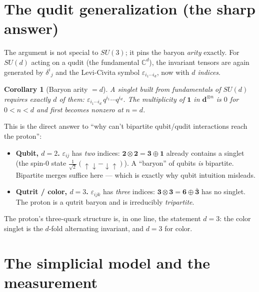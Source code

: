 \documentclass[11pt]{article}
\newtheorem{corollary}{Corollary}
\theoremstyle{definition}
\newcommand{\C}{\mathbb{C}}
\newcommand{\rep}[1]{\mathbf{#1}}      %
\newcommand{\triv}{\mathbf{1}}         %
\begin{document}
\section{The qudit generalization (the sharp answer)}

The argument is not special to $SU(3)$; it pins the baryon \emph{arity} exactly.
For $SU(d)$ acting on a qudit (the fundamental $\C^d$), the invariant tensors are
again generated by $\delta^{i}{}_{j}$ and the Levi-Civita symbol
$\varepsilon_{i_1\cdots i_d}$, now with \emph{$d$ indices}.

\begin{corollary}[Baryon arity $=d$]
A singlet built from fundamentals of $SU(d)$ requires exactly $d$ of them:
$\varepsilon_{i_1\cdots i_d}\,q^{i_1}\!\cdots q^{i_d}$. The multiplicity of
$\triv$ in $\rep d^{\otimes n}$ is $0$ for $0<n<d$ and first becomes nonzero at
$n=d$.
\end{corollary}

This is the direct answer to ``why can't bipartite qubit/qudit interactions reach
the proton'':
\begin{itemize}[nosep]
  \item \textbf{Qubit, $d=2$.} $\varepsilon_{ij}$ has \emph{two} indices:
  $\rep 2\otimes\rep 2=\rep 3\oplus\triv$ already contains a singlet (the spin-$0$
  state $\tfrac{1}{\sqrt2}(\!\uparrow\downarrow-\downarrow\uparrow)$). A
  ``baryon'' of qubits \emph{is} bipartite. Bipartite merges suffice here ---
  which is exactly why qubit intuition misleads.
  \item \textbf{Qutrit / color, $d=3$.} $\varepsilon_{ijk}$ has \emph{three}
  indices: $\rep 3\otimes\rep 3=\rep 6\oplus\bar{\rep 3}$ has no singlet. The
  proton is a qutrit baryon and is irreducibly \emph{tripartite}.
\end{itemize}
The proton's three-quark structure is, in one line, the statement $d=3$: the
color singlet is the $d$-fold alternating invariant, and $d=3$ for color.

\section{The simplicial model and the measurement}
\end{document}
